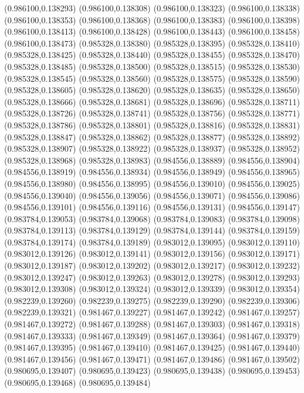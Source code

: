(0.986100,0.138293)
(0.986100,0.138308)
(0.986100,0.138323)
(0.986100,0.138338)
(0.986100,0.138353)
(0.986100,0.138368)
(0.986100,0.138383)
(0.986100,0.138398)
(0.986100,0.138413)
(0.986100,0.138428)
(0.986100,0.138443)
(0.986100,0.138458)
(0.986100,0.138473)
(0.985328,0.138380)
(0.985328,0.138395)
(0.985328,0.138410)
(0.985328,0.138425)
(0.985328,0.138440)
(0.985328,0.138455)
(0.985328,0.138470)
(0.985328,0.138485)
(0.985328,0.138500)
(0.985328,0.138515)
(0.985328,0.138530)
(0.985328,0.138545)
(0.985328,0.138560)
(0.985328,0.138575)
(0.985328,0.138590)
(0.985328,0.138605)
(0.985328,0.138620)
(0.985328,0.138635)
(0.985328,0.138650)
(0.985328,0.138666)
(0.985328,0.138681)
(0.985328,0.138696)
(0.985328,0.138711)
(0.985328,0.138726)
(0.985328,0.138741)
(0.985328,0.138756)
(0.985328,0.138771)
(0.985328,0.138786)
(0.985328,0.138801)
(0.985328,0.138816)
(0.985328,0.138831)
(0.985328,0.138847)
(0.985328,0.138862)
(0.985328,0.138877)
(0.985328,0.138892)
(0.985328,0.138907)
(0.985328,0.138922)
(0.985328,0.138937)
(0.985328,0.138952)
(0.985328,0.138968)
(0.985328,0.138983)
(0.984556,0.138889)
(0.984556,0.138904)
(0.984556,0.138919)
(0.984556,0.138934)
(0.984556,0.138949)
(0.984556,0.138965)
(0.984556,0.138980)
(0.984556,0.138995)
(0.984556,0.139010)
(0.984556,0.139025)
(0.984556,0.139040)
(0.984556,0.139056)
(0.984556,0.139071)
(0.984556,0.139086)
(0.984556,0.139101)
(0.984556,0.139116)
(0.984556,0.139131)
(0.984556,0.139147)
(0.983784,0.139053)
(0.983784,0.139068)
(0.983784,0.139083)
(0.983784,0.139098)
(0.983784,0.139113)
(0.983784,0.139129)
(0.983784,0.139144)
(0.983784,0.139159)
(0.983784,0.139174)
(0.983784,0.139189)
(0.983012,0.139095)
(0.983012,0.139110)
(0.983012,0.139126)
(0.983012,0.139141)
(0.983012,0.139156)
(0.983012,0.139171)
(0.983012,0.139187)
(0.983012,0.139202)
(0.983012,0.139217)
(0.983012,0.139232)
(0.983012,0.139247)
(0.983012,0.139263)
(0.983012,0.139278)
(0.983012,0.139293)
(0.983012,0.139308)
(0.983012,0.139324)
(0.983012,0.139339)
(0.983012,0.139354)
(0.982239,0.139260)
(0.982239,0.139275)
(0.982239,0.139290)
(0.982239,0.139306)
(0.982239,0.139321)
(0.981467,0.139227)
(0.981467,0.139242)
(0.981467,0.139257)
(0.981467,0.139272)
(0.981467,0.139288)
(0.981467,0.139303)
(0.981467,0.139318)
(0.981467,0.139333)
(0.981467,0.139349)
(0.981467,0.139364)
(0.981467,0.139379)
(0.981467,0.139395)
(0.981467,0.139410)
(0.981467,0.139425)
(0.981467,0.139440)
(0.981467,0.139456)
(0.981467,0.139471)
(0.981467,0.139486)
(0.981467,0.139502)
(0.980695,0.139407)
(0.980695,0.139423)
(0.980695,0.139438)
(0.980695,0.139453)
(0.980695,0.139468)
(0.980695,0.139484)
